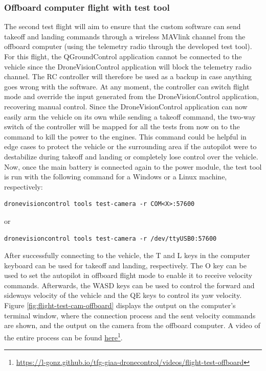 \subsubsection{Offboard computer flight with test tool}
\label{subsec:fl-test-2}

The second test flight will aim to ensure that the custom software can send takeoff and landing commands through a wireless MAVlink channel from the offboard computer (using the telemetry radio through the developed test tool).
For this flight, the QGroundControl application cannot be connected to the vehicle since the DroneVisionControl application will block the telemetry radio channel.
The RC controller will therefore be used as a backup in case anything goes wrong with the software.
At any moment, the controller can switch flight mode and override the input generated from the DroneVisionControl application, recovering manual control.
Since the DroneVisionControl application can now easily arm the vehicle on its own while sending a takeoff command,
the two-way switch of the controller will be mapped for all the tests from now on to the command to kill the power to the engines.
This command could be helpful in edge cases to protect the vehicle or the surrounding area if the autopilot were to destabilize during takeoff and landing or completely lose control over the vehicle.
Now, once the main battery is connected again to the power module, the test tool is run with the following command for a Windows or a Linux machine, respectively:
\begin{verbatim}
dronevisioncontrol tools test-camera -r COM<X>:57600
\end{verbatim}
or
\begin{verbatim}
dronevisioncontrol tools test-camera -r /dev/ttyUSB0:57600
\end{verbatim}

After successfully connecting to the vehicle, the T and L keys in the computer keyboard can be used for takeoff and landing, respectively. The O key can be used to set the autopilot in offboard flight mode to enable it to receive velocity commands.
Afterwards, the WASD keys can be used to control the forward and sideways velocity of the vehicle and the QE keys to control its yaw velocity.
Figure \ref{fig:flight-test-cam-offboard} displays the output on the computer's terminal window, where the connection process and the sent velocity commands are shown, and the output on the camera from the offboard computer.
A video of the entire process can be found \href{https://l-gonz.github.io/tfg-giaa-dronecontrol/videos/flight-test-offboard}{here}\footnote{\url{https://l-gonz.github.io/tfg-giaa-dronecontrol/videos/flight-test-offboard}}.

